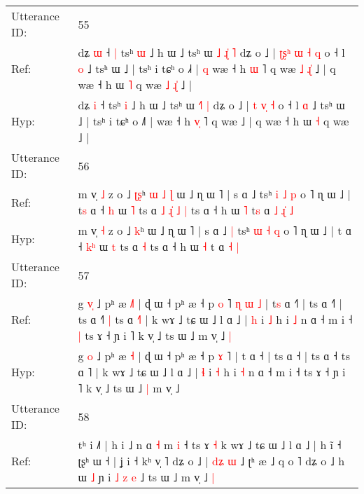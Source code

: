 \documentclass[10pt]{article}
\DeclareRobustCommand{\hl}[1]{{\textcolor{red}{#1}}}
\begin{document}
\begin{longtable}{ll}
 \\
\midrule
Utterance ID: & 55 \\
Ref: & dʑ \hl{ɯ} ˧\hl{ }\hl{|} tsʰ \hl{ɯ} ˩ h ɯ ˩ tsʰ ɯ\hl{ }\hl{˩} \hl{ɻ}\hl{̍} \hl{˥} dʑ o ˩ | \hl{ʈ}\hl{ʂ}\hl{ʰ} \hl{ɯ}\hl{ }\hl{˧} \hl{q} o ˧ l \hl{o} ˩ tsʰ ɯ ˩ | tsʰ i tɕʰ o ˩\hl{˧} |\hl{ }\hl{q} wæ ˧ h \hl{}\hl{ɯ} ˥ q wæ\hl{ }\hl{˩}\hl{ }\hl{ɻ}\hl{̍} ˩ | q wæ ˧ h ɯ \hl{˥} q wæ\hl{ }\hl{˩}\hl{ }\hl{ɻ}\hl{̍} ˩ |
 \\
Hyp: & dʑ \hl{i} ˧\hl{}\hl{} tsʰ \hl{i} ˩ h ɯ ˩ tsʰ ɯ\hl{}\hl{} \hl{˧}\hl{˥} \hl{|} dʑ o ˩ | \hl{}\hl{}\hl{t} \hl{}\hl{v}\hl{̩} \hl{˧} o ˧ l \hl{ɑ} ˩ tsʰ ɯ ˩ | tsʰ i tɕʰ o ˩\hl{˥} |\hl{}\hl{} wæ ˧ h \hl{v}\hl{̩} ˥ q wæ\hl{}\hl{}\hl{}\hl{}\hl{} ˩ | q wæ ˧ h ɯ \hl{˧} q wæ\hl{}\hl{}\hl{}\hl{}\hl{} ˩ |
 \\
\midrule
Utterance ID: & 56 \\
Ref: & m v̩ \hl{˩} z o ˩ \hl{ʈ}\hl{ʂ}ʰ\hl{ }\hl{ɯ}\hl{ }\hl{˩}\hl{ }\hl{ɭ} ɯ ˩ ɳ ɯ ˥ | s ɑ ˩\hl{}\hl{} tsʰ \hl{i} \hl{˩} \hl{p} o ˥ ɳ ɯ ˩ | t\hl{s} ɑ ˧ \hl{}\hl{h} ɯ \hl{˥} ts ɑ\hl{ }\hl{˩}\hl{ }\hl{ɻ}\hl{̍}\hl{ }\hl{˩} \hl{|} ts ɑ ˧ h ɯ \hl{˥} t\hl{s} ɑ\hl{ }\hl{˩} \hl{ɻ}\hl{̍} \hl{˩}
 \\
Hyp: & m v̩ \hl{˧} z o ˩ \hl{}\hl{k}ʰ\hl{}\hl{}\hl{}\hl{}\hl{}\hl{} ɯ ˩ ɳ ɯ ˥ | s ɑ ˩\hl{ }\hl{|} tsʰ \hl{ɯ} \hl{˧} \hl{q} o ˥ ɳ ɯ ˩ | t\hl{} ɑ ˧ \hl{k}\hl{ʰ} ɯ \hl{t} ts ɑ\hl{}\hl{}\hl{}\hl{}\hl{}\hl{}\hl{} \hl{˧} ts ɑ ˧ h ɯ \hl{˧} t\hl{} ɑ\hl{}\hl{} \hl{}\hl{˧} \hl{|}
 \\
\midrule
Utterance ID: & 57 \\
Ref: & g \hl{v}\hl{̩} ˩ pʰ æ \hl{˩}\hl{˥} | ɖ ɯ ˧ pʰ æ ˧ p \hl{o} ˥\hl{ }\hl{ɳ}\hl{ }\hl{ɯ}\hl{ }\hl{˩} | t\hl{s} ɑ ˧\hl{˥} | ts ɑ ˧\hl{˥} | ts ɑ ˧\hl{˥}\hl{ }\hl{|} ts ɑ \hl{˧}˥ | k wɤ ˩ tɕ ɯ ˩ l ɑ ˩ | \hl{h} i \hl{˩} h i \hl{˩} n ɑ ˧ m i ˧\hl{ }\hl{|} ts ɤ ˧ ɲ i ˥ k v̩ ˩ ts ɯ ˩\hl{}\hl{} m v̩ ˩\hl{ }\hl{|}
 \\
Hyp: & g \hl{}\hl{o} ˩ pʰ æ \hl{}\hl{˧} | ɖ ɯ ˧ pʰ æ ˧ p \hl{ɤ} ˥\hl{}\hl{}\hl{}\hl{}\hl{}\hl{} | t\hl{} ɑ ˧\hl{} | ts ɑ ˧\hl{} | ts ɑ ˧\hl{}\hl{}\hl{} ts ɑ \hl{}˥ | k wɤ ˩ tɕ ɯ ˩ l ɑ ˩ | \hl{ɬ} i \hl{˧} h i \hl{˧} n ɑ ˧ m i ˧\hl{}\hl{} ts ɤ ˧ ɲ i ˥ k v̩ ˩ ts ɯ ˩\hl{ }\hl{|} m v̩ ˩\hl{}\hl{}
 \\
\midrule
Utterance ID: & 58 \\
Ref: & tʰ i ˩˥ | h i ˩ n ɑ\hl{}\hl{}\hl{} \hl{˧} m \hl{}\hl{i} ˧ ts ɤ \hl{˧} k wɤ ˩ tɕ ɯ ˩ l ɑ ˩ | h ĩ ˧ ʈʂʰ ɯ ˧ | ʝ i ˧ kʰ v̩ ˥ dʑ o ˩ |\hl{ }\hl{d}\hl{ʑ}\hl{ }\hl{ɯ} ˩ ʈʰ æ ˩ q o ˥ dʑ o ˩ h ɯ \hl{˩} ɲ i\hl{ }\hl{˩}\hl{ }\hl{z}\hl{ }\hl{e} ˩ ts ɯ ˩\hl{}\hl{} m v̩ ˩\hl{ }\hl{|}

\end{longtable}
\end{document}
